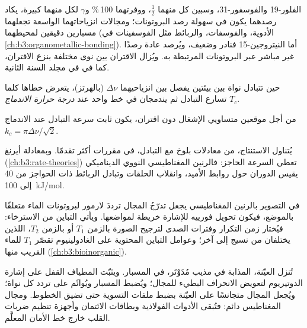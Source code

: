 الفلور-19 والفوسفور-31، وسبين كل منهما $\frac12$، ووفرتهما 100\,\% و$\gamma$
لكل منهما كبيرة، يكاد رصدهما يكون في سهولة رصد البروتونات؛ ومجالات انزياحاتهما الواسعة تجعلهما
مسبارين دقيقين لمحيطهما (الأدوية، والفوسفات، والربائط مثل
الفوسفينات في \cref{ch:b3:organometallic-bonding}). أما النيتروجين-15 فنادر 
وضعيف، ويُرصد عادة رصدًا غير مباشر عبر البروتونات المرتبطة به.
ويُزال الاقتران بين نوى مختلفة بنزع الاقتران، كما في  في
مجلد السنة الثانية.

\begin{definition}\label{def:b3:advanced-nmr:coalescence}
حين تتبادل نواة بين بيئتين يفصل بين انزياحيهما
$\Delta\nu$ (بالهرتز)، يتعرض خطاها كلما تسارع التبادل ثم يندمجان
في خط واحد عند \emph{درجة حرارة الاندماج}
$T_c$.
\end{definition}

\begin{proposition}\label{prop:b3:advanced-nmr:coalescence}
من أجل موقعين متساويي الإشغال دون اقتران، يكون ثابت سرعة التبادل عند
الاندماج $k_c = \pi\Delta\nu/\sqrt2$.
\end{proposition}
\admitted

يُتناول الاستنتاج، من معادلات بلوخ مع التبادل، في مقررات أكثر
تقدمًا. وبمعادلة أيرنغ (\cref{ch:b3:rate-theories}) تعطي السرعة
الحاجز: فالرنين المغناطيسي النووي الديناميكي يقيس الدوران حول روابط الأميد، وانقلاب
الحلقات وتبادل الربائط ذات الحواجز من 40 إلى \qty{100}{kJ/mol}.

\begin{example}\label{ex:b3:advanced-nmr:mri}
في التصوير بالرنين المغناطيسي يجعل تدرّجُ المجال ترددَ لارمور
لبروتونات الماء متعلقًا بالموضع، فيكون تحويل فورييه
للإشارة خريطة لمواضعها. ويأتي التباين من الاسترخاء: فيُختار
زمن التكرار وفترات الصدى لترجيح الصورة بالزمن $T_1$ أو بالزمن
$T_2$، اللذين يختلفان من نسيج إلى آخر؛ وعوامل التباين المحتوية على الغادولينيوم
تقصّر $T_1$ للماء القريب منها (\cref{ch:b3:bioinorganic}).
\end{example}

\begin{inthelab}
تُنزل العيّنة، المذابة في مذيب مُدَوْتَر، في المسبار.
ويثبّت المطياف القفل على إشارة الدوتيريوم لتعويض الانحراف البطيء
للمجال؛ ويُضبط المسبار ويُوائَم على تردد كل نواة؛
ويُجعل المجال متجانسًا على العيّنة بضبط ملفات التسوية
حتى تضيق الخطوط. ومجال المغناطيس دائم: فتُبقى الأدوات الفولاذية
وبطاقات الائتمان وأجهزة تنظيم ضربات القلب خارج خط الأمان المعلَّم.
\end{inthelab}

